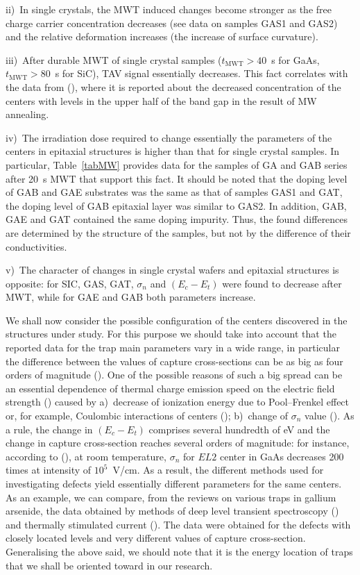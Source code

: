 \documentclass[final,3p,times,twocolumn,authoryear]{elsarticle}
\begin{document}
\noindent
ii)~In single crystals, the  MWT induced changes become stronger as the free charge carrier concentration decreases
(see data on samples GAS1 and GAS2) and the relative deformation increases (the increase of surface curvature).

\noindent
iii)~After durable MWT of single crystal samples ($t_\mathrm{MWT}>40$~s for GaAs,  $t_\mathrm{MWT}>80$~s for SiC),
TAV signal essentially decreases.
This fact correlates with the data  from (\cite{Belyaev1998JTFEn}),
where it is reported about  the decreased concentration of the centers with levels in the upper half of the band gap in the result of MW annealing.

\noindent
iv)~The irradiation dose required to change essentially the parameters of the centers in epitaxial structures is higher than that for single crystal samples.
In particular, Table~\ref{tabMW} provides  data for the samples of GA and GAB series after 20~s MWT
that support this fact.
It should be noted that the doping level of  GAB and GAE substrates was the same as that of samples GAS1 and GAT,
the doping level of GAB epitaxial layer was similar to GAS2.
In addition, GAB, GAE and GAT contained the same doping impurity.
Thus, the found differences are determined by the structure of the samples, but not by the difference of their conductivities.

\noindent
v)~The character of changes in single crystal wafers and epitaxial structures is opposite:
for SIC, GAS, GAT, $\sigma_n$ and $(E_c-E_t)$ were found to decrease after MWT,
while for GAE and GAB both parameters increase.

We shall now consider the possible configuration of the centers discovered in the structures under study.
For this purpose we should take into account that the reported data for the trap main parameters vary in a wide range,
in particular the difference between the values of capture cross-sections can be as big as four orders of magnitude (\cite{Pavlovic2000}).
One of the possible reasons of such a big spread can be an essential dependence
of thermal charge emission speed on  the electric field strength (\cite{Bulyarskii2000,Makram}) caused by
a)~decrease of ionization energy due to Pool--Frenkel effect or, for example, Coulombic interactions of centers (\cite{Stellmacher});
b)~change of $\sigma_n$  value (\cite{Bourgoin2001}).
As a rule, the change in $(E_c-E_t)$ comprises several hundredth of eV and
the change in capture cross-section reaches several orders of magnitude:
for instance, according to (\cite{Bourgoin2001}), at room temperature,
$\sigma_n$  for $EL2$ center in GaAs decreases 200 times
at intensity of $10^5$~V/cm.
As a result, the different methods used for investigating defects yield essentially different parameters for the same centers.
As an example, we can compare, from the reviews on various traps in gallium arsenide,
the data  obtained by methods of deep level transient spectroscopy (\cite{Bourgoin:GaAs})
and thermally stimulated current (\cite{Pavlovic2000}).
The data were obtained for the defects with closely located levels and very different values of capture cross-section.
Generalising the above said, we should note that it is the energy location of traps that we shall be oriented toward in our research.
\end{document}
